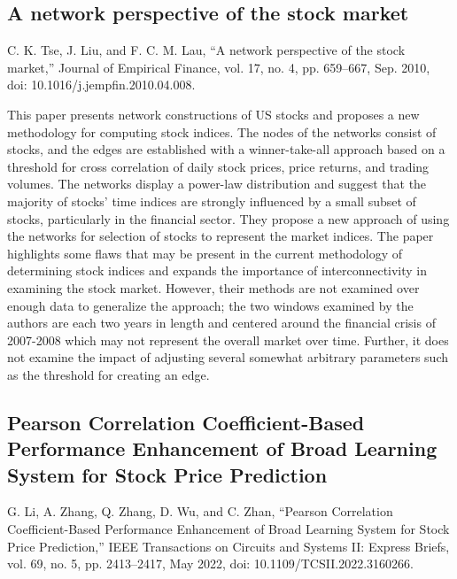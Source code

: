 \documentclass[12pt]{article}
\begin{document}

\subsection{A network perspective of the stock market}
C. K. Tse, J. Liu, and F. C. M. Lau, “A network perspective of the stock market,” Journal of Empirical Finance, vol. 17, no. 4, pp. 659–667, Sep. 2010, doi: 10.1016/j.jempfin.2010.04.008.
\newline

This paper presents network constructions of US stocks and proposes a new methodology for computing stock indices. The nodes of the networks consist of stocks, and the edges are established with a winner-take-all approach based on a threshold for cross correlation of daily stock prices, price returns, and trading volumes. The networks display a power-law distribution and suggest that the majority of stocks' time indices are strongly influenced by a small subset of stocks, particularly in the financial sector. They propose a new approach of using the networks for selection of stocks to represent the market indices. The paper highlights some flaws that may be present in the current methodology of determining stock indices and expands the importance of interconnectivity in examining the stock market. However, their methods are not examined over enough data to generalize the approach; the two windows examined by the authors are each two years in length and centered around the financial crisis of 2007-2008 which may not represent the overall market over time. Further, it does not examine the impact of adjusting several somewhat arbitrary parameters such as the threshold for creating an edge.


\subsection{Pearson Correlation Coefficient-Based Performance Enhancement of Broad Learning System for Stock Price Prediction}
G. Li, A. Zhang, Q. Zhang, D. Wu, and C. Zhan, “Pearson Correlation Coefficient-Based Performance Enhancement of Broad Learning System for Stock Price Prediction,” IEEE Transactions on Circuits and Systems II: Express Briefs, vol. 69, no. 5, pp. 2413–2417, May 2022, doi: 10.1109/TCSII.2022.3160266.
\newline
\end{document}
